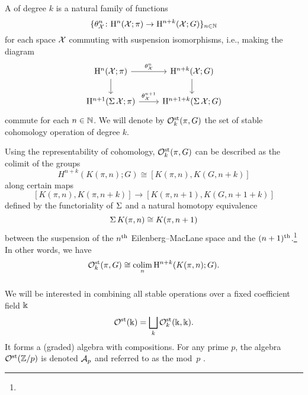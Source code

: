 \subsubsection{} A  of degree $k$ is a natural family of functions
\[
\{\theta^n_{\mathcal{X}} \colon \mathrm{H}^n(\mathcal{X}; \pi) \to \mathrm{H}^{n+k}(\mathcal{X}; G)\}_{n \in \mathbb{N}}
\]
for each space $\mathcal{X}$ commuting with suspension isomorphisms, i.e., making the diagram
\[
\begin{tikzcd}
	\rH^n(\cX; \pi) \rar["\theta^n_\cX"] \dar & \rH^{n+k}(\cX; G) \dar \\
	\rH^{n+1}(\sus \cX; \pi) \rar["\theta^{n+1}_\cX"] & \rH^{n+1+k}(\sus \cX; G)
\end{tikzcd}
\]
commute for each $n \in \mathbb{N}$.
We will denote by $\mathcal{O}^{\mathrm{st}}_k(\pi, G)$ the set of stable cohomology operation of degree $k$.


Using the representability of cohomology, $\mathcal{O}^{\mathrm{st}}_k(\pi, G)$ can be described as the colimit of the groups
\[
H^{n+k}(K(\pi, n); G) \cong [K(\pi, n), K(G, n+k)]
\]
along certain maps
\[
[K(\pi, n), K(\pi, n+k)] \to [K(\pi, n+1), K(G, n+1+k)]
\]
defined by the functoriality of $\operatorname{\Sigma}$ and a natural homotopy equivalence
\begin{equation}\label{eq:suspension of K(pi,n)}
	\operatorname{\Sigma} K(\pi, n) \cong K(\pi, n+1)
\end{equation}
between the suspension of the $n^{\mathrm{th}}$ Eilenberg--MacLane space and the $(n+1)^{\mathrm{th}}$.\footnote{}
In other words, we have
\[
\mathcal{O}^{\mathrm{st}}_k(\pi, G) \cong \operatorname*{colim}_n \mathrm{H}^{n+k}(K(\pi, n); G).
\]

\subsubsection{} We will be interested in combining all stable operations over a fixed coefficient field $\Bbbk$
\[
\mathcal{O}^{\mathrm{st}}(\Bbbk) = \bigsqcup_k \mathcal{O}^{\mathrm{st}}_k(\Bbbk, \Bbbk).
\]
It forms a (graded) algebra with compositions.
For any prime $p$, the algebra $\mathcal{O}^{\mathrm{st}}(\mathbb{Z}/p)$ is denoted $\mathcal{A}_p$ and referred to as the mod~$p$ .

